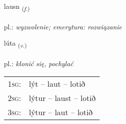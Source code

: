 \documentclass[frontgrid, backgrid]{flacards}\usepackage[]{graphicx}\usepackage[]{xcolor}
\begin{document}
\renewcommand{\blhead}{\vskip5pt {\small\bfseries\footnotesize Nafnorð | Noun }}
\renewcommand{\bcfoot}{\vskip5pt \hspace{2pt}{\small\bfseries\footnotesize 2K}}


{lausn \small{\textsubscript{(\textit{f.})}} \\[1ex] %
\textphonetic{[lœistn̥]} \\
pl.: \emph{wyzwolenie; emerytura: rozwiązanie} \\  [2ex]
\renewcommand*{\arraystretch}{0.8}
}

\renewcommand{\flhead}{\vskip5pt \fboxsep=0pt {\small\bfseries\footnotesize Sagnorð | Verb}}
\renewcommand{\fcfoot}{\vskip5pt \fboxsep=0pt \hspace{2pt}{\small\bfseries\footnotesize 2K}}

\renewcommand{\blhead}{\vskip5pt {\small\bfseries\footnotesize Sagnorð | Verb }}
\renewcommand{\bcfoot}{\vskip5pt \hspace{2pt}{\small\bfseries\footnotesize 2K}}


{lúta \small{\textsubscript{(\textit{v.})}} \\[1ex] %
\textphonetic{[luːta]} \\
pl.: \emph{kłonić się, pochylać} \\  [2ex]
\renewcommand*{\arraystretch}{0.8}
\begin{tabular}{p{1cm}l}
\textsc{1sg}: & lýt -- laut -- lotið \\ 
\textsc{2sg}: & lýtur -- laust -- lotið \\ 
\textsc{3sg}: & lýtur -- laut -- lotið \\ 
\end{tabular}
}
\end{document}
